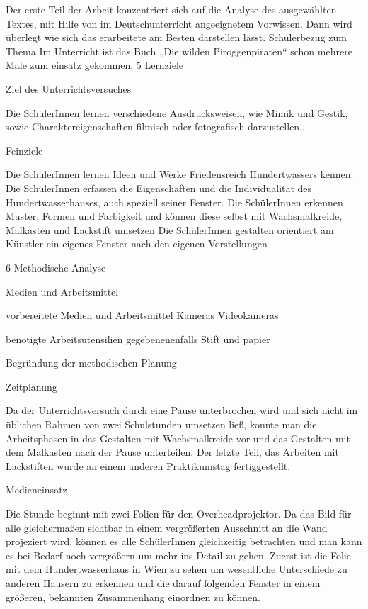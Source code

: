 Der erste Teil der Arbeit konzentriert sich auf die Analyse des ausgewählten Textes, mit Hilfe von im Deutschunterricht angeeignetem Vorwissen. Dann wird überlegt wie sich das erarbeitete am Besten darstellen lässt.
 Schülerbezug zum Thema
Im Unterricht ist das Buch „Die wilden Piroggenpiraten“  schon mehrere Male zum einsatz gekommen. 
5 Lernziele

Ziel des Unterrichtsversuches

Die SchülerInnen lernen verschiedene Ausdrucksweisen, wie Mimik und Gestik, sowie Charaktereigenschaften filmisch oder fotografisch darzustellen..


Feinziele

Die SchülerInnen lernen Ideen und Werke Friedensreich Hundertwassers kennen.
Die SchülerInnen erfassen die Eigenschaften und die Individualität des Hundertwasserhauses, auch speziell seiner Fenster.
Die SchülerInnen erkennen Muster, Formen und Farbigkeit und können diese selbst mit Wachsmalkreide, Malkasten und Lackstift umsetzen
Die SchülerInnen gestalten orientiert am Künstler ein eigenes Fenster nach den eigenen Vorstellungen

6 Methodische Analyse

 Medien und Arbeitsmittel

vorbereitete Medien und Arbeitsmittel
Kameras 
Videokameras

benötigte Arbeitsutensilien
gegebenenenfalls Stift und papier


 Begründung der methodischen Planung

Zeitplanung

Da der Unterrichtsversuch durch eine Pause unterbrochen wird und sich nicht im üblichen Rahmen von zwei Schulstunden umsetzen ließ, konnte man die Arbeitsphasen in das Gestalten mit Wachsmalkreide vor und das Gestalten mit dem Malkasten nach der Pause unterteilen. Der letzte Teil, das Arbeiten mit Lackstiften wurde an einem anderen Praktikumstag fertiggestellt.

Medieneinsatz

Die Stunde beginnt mit zwei Folien für den Overheadprojektor. Da das Bild für alle gleichermaßen sichtbar in einem vergrößerten Ausschnitt an die Wand projeziert wird, können es alle SchülerInnen gleichzeitig betrachten und man kann es bei Bedarf noch vergrößern um mehr ins Detail zu gehen. Zuerst ist die Folie mit dem Hundertwasserhaus in Wien zu sehen um wesentliche Unterschiede zu anderen Häusern zu erkennen und die darauf folgenden Fenster in einem größeren, bekannten Zusammenhang einordnen zu können.

